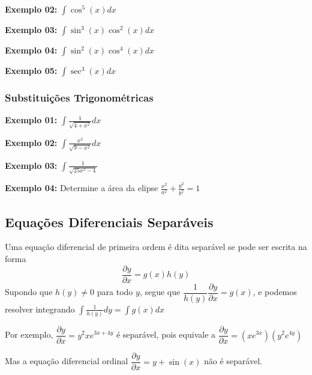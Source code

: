 \documentclass[oneside,a4paper,12pt]{article}
\begin{document}
{\bf Exemplo 02:} $\int \cos^{5}(x)dx$

\vspace{300pt}

{\bf Exemplo 03:} $\int \sin^{3}(x)\cos^{2}(x)dx$

\vspace{270pt}

{\bf Exemplo 04:} $\int \sin^{2}(x)\cos^{4}(x)dx$

\vspace{500pt}

{\bf Exemplo 05:} $\int \sec^{3}(x)dx$

\vspace{300pt}

\subsubsection{Substituições Trigonométricas}

{\bf Exemplo 01:} $\int \frac{1}{\sqrt{4 + x^2}}dx$

\vspace{300pt}

{\bf Exemplo 02:} $\int \frac{x^2}{\sqrt{9-x^2}}dx$

\vspace{300pt}

{\bf Exemplo 03:} $\int \frac{1}{\sqrt{25x^2 - 4}}$

\vspace{300pt}

{\bf Exemplo 04:} Determine a área da elipse $\frac{x^2}{a^2}+\frac{y^2}{b^2} = 1$

\newpage

\subsection{Equações Diferenciais Separáveis}

Uma equação diferencial de primeira ordem é dita separável se pode ser escrita na forma
$$\dfrac{\partial y}{\partial x} = g(x)h(y)$$
Supondo que $h(y) \neq 0$ para todo $y$, segue que $\dfrac{1}{h(y)}\dfrac{\partial y}{\partial x} = g(x)$, e podemos resolver integrando $\int \frac{1}{h(y)}dy = \int g(x)dx$

Por exemplo, $\dfrac{\partial y}{\partial x} = y^2 x e^{3x+4y}$ é separável, pois equivale a $\dfrac{\partial y}{\partial x} = (xe^{3x})(y^2 e^{4y})$

Mas a equação diferencial ordinal $\dfrac{\partial y}{\partial x} = y + \sin(x)$ não é separável.
\end{document}
